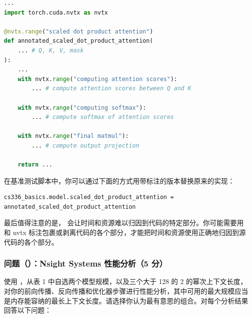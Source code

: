 \begin{lstlisting}[language=Python]
...
import torch.cuda.nvtx as nvtx

@nvtx.range("scaled dot product attention")
def annotated_scaled_dot_product_attention(
    ... # Q, K, V, mask
):
    ...
    with nvtx.range("computing attention scores"):
        ... # compute attention scores between Q and K

    with nvtx.range("computing softmax"):
        ... # compute softmax of attention scores

    with nvtx.range("final matmul"):
        ... # compute output projection

    return ...
\end{lstlisting}

在基准测试脚本中，你可以通过下面的方式用带标注的版本替换原来的实现：

\begin{lstlisting}
cs336_basics.model.scaled_dot_product_attention = annotated_scaled_dot_product_attention
\end{lstlisting}

最后值得注意的是， 会让时间和资源难以归因到代码的特定部分。你可能需要用  和 nvtx 标注包裹或剥离代码的各个部分，才能把时间和资源使用正确地归因到源代码的各个部分。

\subsubsection*{问题（）：Nsight Systems 性能分析（5 分）}

使用 ，从表 1 中自选两个模型规模，以及三个大于 128 的 2 的幂次上下文长度，对你的前向传播、反向传播和优化器步骤进行性能分析，其中可用的最大规模应当是内存能容纳的最长上下文长度。请选择你认为最有意思的组合。对每个分析结果回答以下问题：

